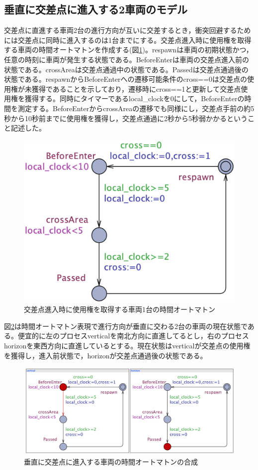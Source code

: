 \documentclass{tpu-sotu}
\begin{document}
	\subsection{垂直に交差点に進入する2車両のモデル}
	交差点に直進する車両2台の進行方向が互いに交差するとき，衝突回避するためには交差点に同時に進入するのは1台までにする。交差点進入時に使用権を取得する車両の時間オートマトンを作成する(図\ref{Perpendicular})。respawnは車両の初期状態かつ，任意の時刻に車両が発生する状態である。BeforeEnterは車両の交差点進入前の状態である。crossAreaは交差点通過中の状態である。Passedは交差点通過後の状態である。respawnからBeforeEnterへの遷移可能条件のcross==0は交差点の使用権が未獲得であることを示しており，遷移時にcross==1と更新して交差点使用権を獲得する。同時にタイマーであるlocal\_clockを0にして，BeforeEnterの時間を測定する。BeforeEnterからcrossAreaの遷移でも同様にし，交差点手前の約5秒から10秒前までに使用権を獲得し，交差点通過に2秒から5秒弱かかるということ記述した。
	\begin{figure}[htbp]
	\centering
	\includegraphics[width=125mm]{Perpendicular.png}
	\caption{交差点進入時に使用権を取得する車両1台の時間オートマトン}
	\label{Perpendicular}
	\end{figure}
	
	図\ref{PerpendicularS}は時間オートマトン表現で進行方向が垂直に交わる2台の車両の現在状態である。便宜的に左のプロセスverticalを南北方向に直進してるとし，右のプロセスhorizonを東西方向に直進しているとする。現在状態はverticalが交差点の使用権を獲得し，進入前状態で，horizonが交差点通過後の状態である。
	\begin{figure}[htbp]
	\centering
	\includegraphics[width=130mm]{PerpendicularSimu.png}
	\caption{垂直に交差点に進入する車両の時間オートマトンの合成}
	\label{PerpendicularS}
	\end{figure}
	
\end{document}
